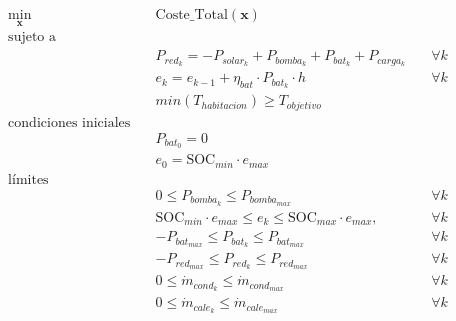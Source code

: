 \begin{align}
	\min_{\mathbf{x}} \quad & \text{Coste\_Total}(\mathbf{x})                                                                                                        \\
	\text{sujeto a} \quad   &                                                                                                                                        \\
	                        & P_{red_k} = -P_{solar_k} + P_{bomba_k} + P_{bat_k} + P_{carga_k} \quad                                                     & \forall k \\
	                        & e_k = e_{k-1} + \eta_{bat} \cdot P_{bat_k} \cdot h \quad                                                                   & \forall k \\
	                        & min(T_{habitacion}) \geq T_{objetivo}                                               \label{eq:min_t_habitacion_constraint}             \\
	\text{condiciones iniciales} \quad                                                                                                                               \\
	                        & P_{bat_0} = 0                                                                                                                          \\
	                        & e_0 = \text{SOC}_{min} \cdot e_{max}                                                                                                   \\
	\text{límites} \quad    &                                                                                                                                        \\
	                        & 0 \leq P_{bomba_k} \leq P_{bomba_{max}} \quad                                                                              & \forall k \\
	                        & \text{SOC}_{min} \cdot e_{max} \leq e_k \leq \text{SOC}_{max} \cdot e_{max}, \quad                                         & \forall k \\
	                        & -P_{bat_{max}} \leq P_{bat_k} \leq P_{bat_{max}} \quad                                                                     & \forall k \\
	                        & -P_{red_{max}} \leq P_{red_k} \leq P_{red_{max}} \quad                                                                     & \forall k \\
	                        & 0 \leq \dot{m}_{cond_k} \leq \dot{m}_{cond_{max}} \quad                                                                    & \forall k \\
	                        & 0 \leq \dot{m}_{cale_k} \leq \dot{m}_{cale_{max}} \quad                                                                    & \forall k \\
\end{align}


